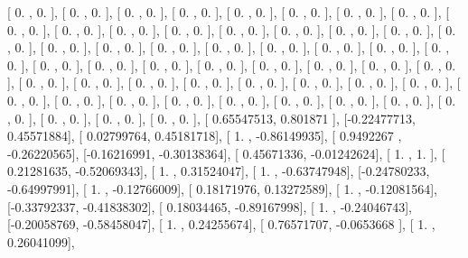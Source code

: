 \documentclass{article}
\begin{document}
       [ 0.        ,  0.        ],
       [ 0.        ,  0.        ],
       [ 0.        ,  0.        ],
       [ 0.        ,  0.        ],
       [ 0.        ,  0.        ],
       [ 0.        ,  0.        ],
       [ 0.        ,  0.        ],
       [ 0.        ,  0.        ],
       [ 0.        ,  0.        ],
       [ 0.        ,  0.        ],
       [ 0.        ,  0.        ],
       [ 0.        ,  0.        ],
       [ 0.        ,  0.        ],
       [ 0.        ,  0.        ],
       [ 0.        ,  0.        ],
       [ 0.        ,  0.        ],
       [ 0.        ,  0.        ],
       [ 0.        ,  0.        ],
       [ 0.        ,  0.        ],
       [ 0.        ,  0.        ],
       [ 0.        ,  0.        ],
       [ 0.        ,  0.        ],
       [ 0.        ,  0.        ],
       [ 0.        ,  0.        ],
       [ 0.        ,  0.        ],
       [ 0.        ,  0.        ],
       [ 0.        ,  0.        ],
       [ 0.        ,  0.        ],
       [ 0.        ,  0.        ],
       [ 0.        ,  0.        ],
       [ 0.        ,  0.        ],
       [ 0.        ,  0.        ],
       [ 0.        ,  0.        ],
       [ 0.        ,  0.        ],
       [ 0.        ,  0.        ],
       [ 0.        ,  0.        ],
       [ 0.        ,  0.        ],
       [ 0.        ,  0.        ],
       [ 0.        ,  0.        ],
       [ 0.        ,  0.        ],
       [ 0.        ,  0.        ],
       [ 0.        ,  0.        ],
       [ 0.        ,  0.        ],
       [ 0.        ,  0.        ],
       [ 0.        ,  0.        ],
       [ 0.        ,  0.        ],
       [ 0.        ,  0.        ],
       [ 0.        ,  0.        ],
       [ 0.        ,  0.        ],
       [ 0.        ,  0.        ],
       [ 0.        ,  0.        ],
       [ 0.        ,  0.        ],
       [ 0.        ,  0.        ],
       [ 0.65547513,  0.801871  ],
       [-0.22477713,  0.45571884],
       [ 0.02799764,  0.45181718],
       [ 1.        , -0.86149935],
       [ 0.9492267 , -0.26220565],
       [-0.16216991, -0.30138364],
       [ 0.45671336, -0.01242624],
       [ 1.        ,  1.        ],
       [ 0.21281635, -0.52069343],
       [ 1.        ,  0.31524047],
       [ 1.        , -0.63747948],
       [-0.24780233, -0.64997991],
       [ 1.        , -0.12766009],
       [ 0.18171976,  0.13272589],
       [ 1.        , -0.12081564],
       [-0.33792337, -0.41838302],
       [ 0.18034465, -0.89167998],
       [ 1.        , -0.24046743],
       [-0.20058769, -0.58458047],
       [ 1.        ,  0.24255674],
       [ 0.76571707, -0.0653668 ],
       [ 1.        ,  0.26041099],
\end{document}

